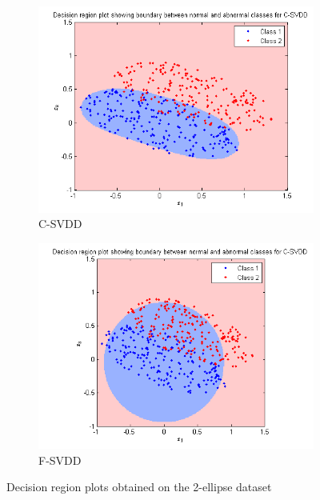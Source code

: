 \documentclass{article} %
\begin{document}
\begin{figure}
\begin{subfigure}{.5\textwidth}
  \centering
  \includegraphics[width=\linewidth]{../Code/Ellipse/svdd/decn}
\caption{C-SVDD} 
\end{subfigure}%
\begin{subfigure}{.5\textwidth}
  \centering
  \includegraphics[width=\linewidth]{../Code/Ellipse/fsvdd/decn}
\caption{F-SVDD}  
\end{subfigure}
\caption{Decision region plots obtained on the 2-ellipse dataset}
\end{figure}



\end{document}
